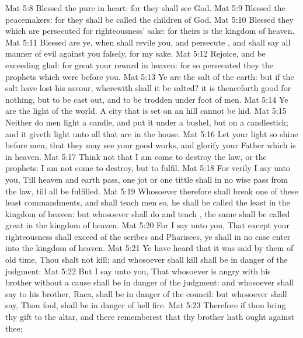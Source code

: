 \vs Mat 5:8 Blessed  the pure in heart: for they shall see God.
\vs Mat 5:9 Blessed  the peacemakers: for they shall be called the children of God.
\vs Mat 5:10 Blessed  they which are persecuted for righteousness' sake: for theirs is the kingdom of heaven.
\vs Mat 5:11 Blessed are ye, when  shall revile you, and persecute , and shall say all manner of evil against you falsely, for my sake.
\vs Mat 5:12 Rejoice, and be exceeding glad: for great  your reward in heaven: for so persecuted they the prophets which were before you.
\vs Mat 5:13 Ye are the salt of the earth: but if the salt have lost his savour, wherewith shall it be salted? it is thenceforth good for nothing, but to be cast out, and to be trodden under foot of men.
\vs Mat 5:14 Ye are the light of the world. A city that is set on an hill cannot be hid.
\vs Mat 5:15 Neither do men light a candle, and put it under a bushel, but on a candlestick; and it giveth light unto all that are in the house.
\vs Mat 5:16 Let your light so shine before men, that they may see your good works, and glorify your Father which is in heaven.
\vs Mat 5:17 Think not that I am come to destroy the law, or the prophets: I am not come to destroy, but to fulfil.
\vs Mat 5:18 For verily I say unto you, Till heaven and earth pass, one jot or one tittle shall in no wise pass from the law, till all be fulfilled.
\vs Mat 5:19 Whosoever therefore shall break one of these least commandments, and shall teach men so, he shall be called the least in the kingdom of heaven: but whosoever shall do and teach , the same shall be called great in the kingdom of heaven.
\vs Mat 5:20 For I say unto you, That except your righteousness shall exceed  of the scribes and Pharisees, ye shall in no case enter into the kingdom of heaven.
\vs Mat 5:21 Ye have heard that it was said by them of old time, Thou shalt not kill; and whosoever shall kill shall be in danger of the judgment:
\vs Mat 5:22 But I say unto you, That whosoever is angry with his brother without a cause shall be in danger of the judgment: and whosoever shall say to his brother, Raca, shall be in danger of the council: but whosoever shall say, Thou fool, shall be in danger of hell fire.
\vs Mat 5:23 Therefore if thou bring thy gift to the altar, and there rememberest that thy brother hath ought against thee;
